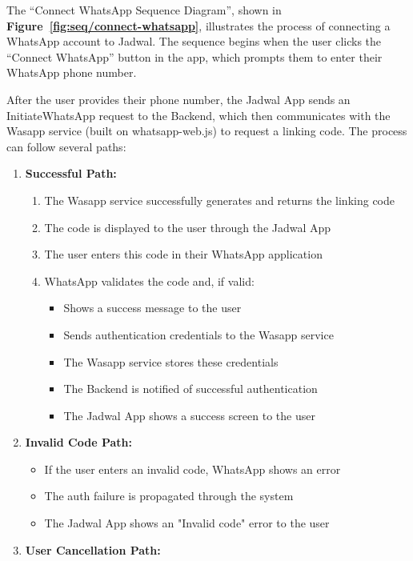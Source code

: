 The ``Connect WhatsApp Sequence Diagram'', shown in \textbf{Figure~\ref{fig:seq/connect-whatsapp}}, illustrates the process of connecting a WhatsApp account to Jadwal. The sequence begins when the user clicks the ``Connect WhatsApp'' button in the app, which prompts them to enter their WhatsApp phone number.

After the user provides their phone number, the Jadwal App sends an InitiateWhatsApp request to the Backend, which then communicates with the Wasapp service (built on whatsapp-web.js) to request a linking code. The process can follow several paths:

\begin{enumerate}
  \item \textbf{Successful Path:}
        \begin{enumerate}
          \item The Wasapp service successfully generates and returns the linking code
          \item The code is displayed to the user through the Jadwal App
          \item The user enters this code in their WhatsApp application
          \item WhatsApp validates the code and, if valid:
                \begin{itemize}
                  \item Shows a success message to the user
                  \item Sends authentication credentials to the Wasapp service
                  \item The Wasapp service stores these credentials
                  \item The Backend is notified of successful authentication
                  \item The Jadwal App shows a success screen to the user
                \end{itemize}
        \end{enumerate}
  \item \textbf{Invalid Code Path:}
        \begin{itemize}
          \item If the user enters an invalid code, WhatsApp shows an error
          \item The auth failure is propagated through the system
          \item The Jadwal App shows an "Invalid code" error to the user
        \end{itemize}
  \item \textbf{User Cancellation Path:}

\end{enumerate}
